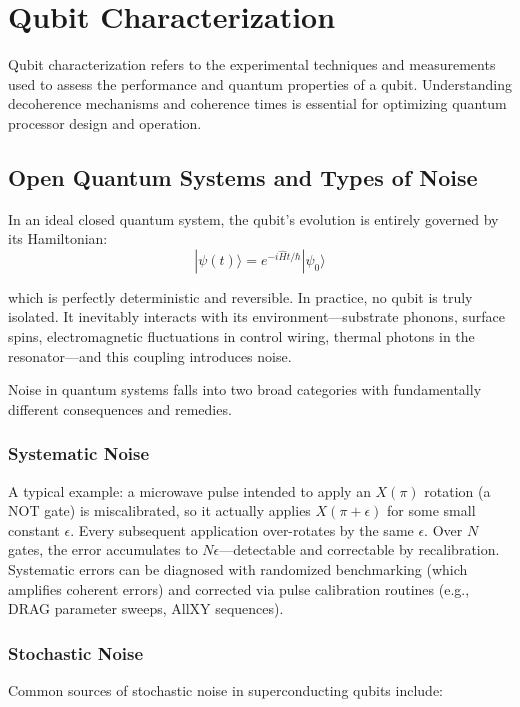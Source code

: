 \documentclass{article}
\begin{document}
\newpage
\section{Qubit Characterization}

Qubit characterization refers to the experimental techniques and measurements used to assess the performance and quantum properties of a qubit. Understanding decoherence mechanisms and coherence times is essential for optimizing quantum processor design and operation.

\subsection{Open Quantum Systems and Types of Noise}

In an ideal closed quantum system, the qubit's evolution is entirely governed by its Hamiltonian:
$$|\psi(t)\rangle = e^{-i\hat{H}t/\hbar}|\psi_0\rangle$$

which is perfectly deterministic and reversible. In practice, no qubit is truly isolated. It inevitably interacts with its environment—substrate phonons, surface spins, electromagnetic fluctuations in control wiring, thermal photons in the resonator—and this coupling introduces noise.

Noise in quantum systems falls into two broad categories with fundamentally different consequences and remedies.

\subsubsection*{Systematic Noise}

A typical example: a microwave pulse intended to apply an $X(\pi)$ rotation (a NOT gate) is miscalibrated, so it actually applies $X(\pi + \epsilon)$ for some small constant $\epsilon$. Every subsequent application over-rotates by the same $\epsilon$. Over $N$ gates, the error accumulates to $N\epsilon$—detectable and correctable by recalibration. Systematic errors can be diagnosed with randomized benchmarking (which amplifies coherent errors) and corrected via pulse calibration routines (e.g., DRAG parameter sweeps, AllXY sequences).

\subsubsection*{Stochastic Noise}

Common sources of stochastic noise in superconducting qubits include:
\end{document}

